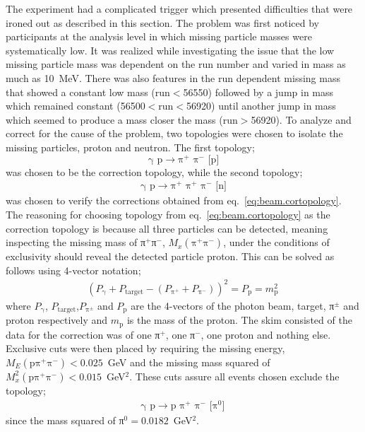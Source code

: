 The  experiment had a complicated trigger which presented difficulties that were ironed out as described in this section. The problem was first noticed by  participants at the analysis level in which missing particle masses were systematically low. It was realized while investigating the issue that the low missing particle mass was dependent on the run number and varied in mass as much as 10~MeV. There was also features in the run dependent missing mass that showed a constant low mass (run$<$56550) followed by a jump in mass which remained constant (56500$<$run$<$56920) until another jump in mass which seemed to produce a mass closer the  mass (run$>$56920). To analyze and correct for the cause of the problem, two topologies were chosen to isolate the missing particles, proton and neutron. The first topology;
\begin{equation}
    \text{γ p$\rightarrow$π$^+$ π$^-$ [p]}
    \label{eq:beam.cortopology}
\end{equation}
was chosen to be the correction topology, while the second topology;
\begin{align}
    \text{γ p$\rightarrow$π$^+$ π$^+$ π$^-$ [n]}
    \label{eq:beam.checktopology}
\end{align}
was chosen to verify the corrections obtained from eq.~\ref{eq:beam.cortopology}. The reasoning for choosing topology from eq.~\ref{eq:beam.cortopology} as the correction topology is because all three particles can be detected, meaning inspecting the missing mass of π$^+$π$^-$, $M_x(\text{π$^+$π$^-$})$, under the conditions of exclusivity should reveal the detected particle proton. This can be solved as follows using 4-vector notation;
\begin{align}
    (P_\text{γ} + P_\mathrm{target} - (P_\text{π$^+$} + P_\text{π$^-$}))^2 = P_\text{p} = m_\text{p}^2 \,
\end{align}
where $P_\text{γ}$, $P_\mathrm{target}$,$P_\text{π$^\pm$}$ and $P_\text{p}$ are the 4-vectors of the photon beam, target, π$^\pm$ and proton respectively and $m_\text{p}$ is the mass of the proton.
The skim consisted of the data for the correction was of one   π$^+$, one   π$^-$, one   proton and nothing else. Exclusive cuts were then placed by requiring the missing energy, $M_E(\text{pπ$^+$π$^-$}) < 0.025$~GeV and the missing mass squared of $M_x^2(\text{pπ$^+$π$^-$}) < 0.015$~GeV$^2$. These cuts assure all events chosen exclude the topology;
\begin{align}
    \text{γ p}\rightarrow\text{p π$^+$ π$^-$ [π$^0$]} \nonumber \,
\end{align}
since the mass squared of π$^0 = 0.0182$~GeV$^2$.

